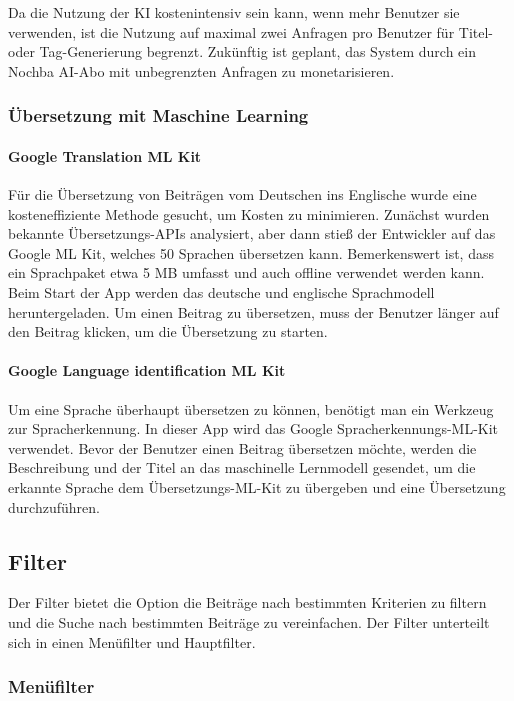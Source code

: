 Da die Nutzung der KI kostenintensiv sein kann, wenn mehr Benutzer sie verwenden, ist die Nutzung auf maximal zwei Anfragen pro Benutzer für Titel- oder Tag-Generierung begrenzt. Zukünftig ist geplant, das System durch ein Nochba AI-Abo mit unbegrenzten Anfragen zu monetarisieren.

\subsubsection{Übersetzung mit Maschine Learning}

\paragraph{Google Translation ML Kit}

Für die Übersetzung von Beiträgen vom Deutschen ins Englische wurde eine kosteneffiziente Methode gesucht, um Kosten zu minimieren. Zunächst wurden bekannte Übersetzungs-APIs analysiert, aber dann stieß der Entwickler auf das Google ML Kit, welches 50 Sprachen übersetzen kann. Bemerkenswert ist, dass ein Sprachpaket etwa 5 MB umfasst und auch offline verwendet werden kann. Beim Start der App werden das deutsche und englische Sprachmodell heruntergeladen. Um einen Beitrag zu übersetzen, muss der Benutzer länger auf den Beitrag klicken, um die Übersetzung zu starten.



\paragraph{Google Language identification ML Kit}

Um eine Sprache überhaupt übersetzen zu können, benötigt man ein Werkzeug zur Spracherkennung. In dieser App wird das Google Spracherkennungs-ML-Kit verwendet. Bevor der Benutzer einen Beitrag übersetzen möchte, werden die Beschreibung und der Titel an das maschinelle Lernmodell gesendet, um die erkannte Sprache dem Übersetzungs-ML-Kit zu übergeben und eine Übersetzung durchzuführen.


\subsection{Filter}
Der Filter bietet die Option die Beiträge nach bestimmten Kriterien zu filtern und die Suche nach bestimmten Beiträge zu vereinfachen. Der Filter unterteilt sich in einen Menüfilter und Hauptfilter.

\subsubsection{Menüfilter}


